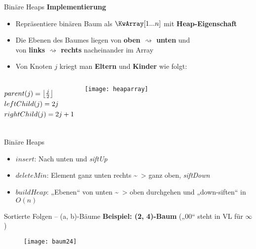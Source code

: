 \begin{frame}{Binäre Heaps}
	\textbf{Implementierung} \\
	\begin{itemize}
		\item Repräsentiere binären Baum als $\KwArray[1...n]$ mit \textbf{Heap-Eigenschaft}
		\item Die Ebenen des Baumes liegen von \textbf{oben $\rightsquigarrow$ unten} und \\ von \textbf{links $\rightsquigarrow$ rechts} nacheinander im Array 
		
		\item Von Knoten $j$ kriegt man \textbf{Eltern} und \textbf{Kinder} wie folgt:
	\end{itemize}

	\begin{columns}
		\vspace{-7\baselineskip} %
		\begin{align*}
		&parent(j) = \left\lfloor\tfrac{j}{2}\right\rfloor \\
		&leftChild(j) = 2j \\
		&rightChild(j) = 2j + 1
		\end{align*}
		
		\texttt{[image: heaparray]}
	\end{columns}
\end{frame}

\begin{frame}{Binäre Heaps}
	\begin{itemize}
		\item $insert$: Nach unten und \emph{siftUp}
		\item $deleteMin$: Element ganz unten rechts \~~> ganz oben, \emph{siftDown}
		\item $buildHeap$: „Ebenen“ von unten \~~> oben durchgehen und „down-siften“ \quad in $O(n)$
	\end{itemize}
\end{frame}





\begin{frame}{Sortierte Folgen -- (a, b)-Bäume}
	\textbf{Beispiel: (2, 4)-Baum} („00“ steht in VL für $\infty$) \\[0,125cm]
	\begin{figure}[htp]
		\centering
		\texttt{[image: baum24]}
	\end{figure}
\end{frame}




